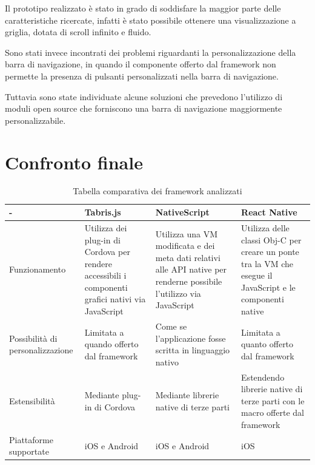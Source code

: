 Il prototipo realizzato è stato in grado di soddisfare la maggior parte delle caratteristiche ricercate, infatti è stato possibile ottenere una visualizzazione a griglia, dotata di scroll infinito e fluido.

Sono stati invece incontrati dei problemi riguardanti la personalizzazione della barra di navigazione, in quando il componente offerto dal framework non permette la presenza di pulsanti personalizzati nella barra di navigazione.

Tuttavia sono state individuate alcune soluzioni che prevedono l'utilizzo di moduli open source che forniscono una barra di navigazione maggiormente personalizzabile.

\FloatBarrier
\section{Confronto finale}

\begin{table}[h]
\centering

\begin{tabular}{|m{2.3cm}|m{3cm}|m{3cm}|m{3cm}|}
\hline - & Tabris.js & NativeScript & React Native   \\ 
\hline  

Funzionamento & Utilizza dei plug-in di Cordova per rendere accessibili i componenti grafici nativi via JavaScript & Utilizza una VM modificata e dei meta dati relativi alle API native per renderne possibile l'utilizzo via JavaScript  & Utilizza delle classi Obj-C per creare un ponte tra la VM che esegue il JavaScript e le componenti native   \\ 

\hline  

 Possibilità di personalizzazione & Limitata a quando offerto dal framework & Come se l'applicazione fosse scritta in linguaggio nativo & Limitata a quanto offerto dal framework   \\
 
\hline 

 Estensibilità & Mediante plug-in di Cordova & Mediante librerie native di terze parti & Estendendo librerie native di terze parti con le macro offerte dal framework  \\ 

\hline

 Piattaforme supportate & iOS e Android & iOS e Android & iOS   \\

\hline

\end{tabular}

\caption{Tabella comparativa dei framework analizzati}
\label{my-label}
\end{table}

